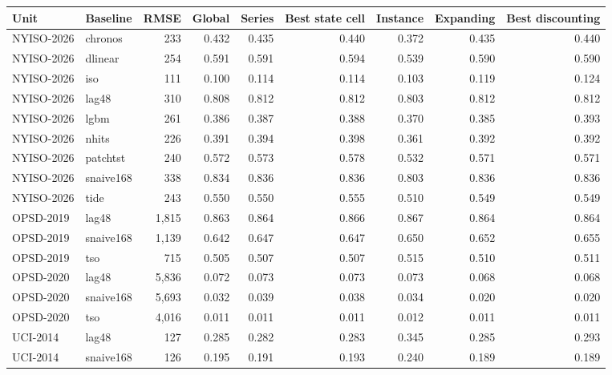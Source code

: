 \begin{tabular}{@{}l l r r r r r r r@{}}\toprule
Unit & Baseline & RMSE & Global & Series & Best state cell & Instance & Expanding & Best discounting \\\midrule
NYISO-2026 & chronos & 233 & 0.432 & 0.435 & 0.440 & 0.372 & 0.435 & 0.440 \\
NYISO-2026 & dlinear & 254 & 0.591 & 0.591 & 0.594 & 0.539 & 0.590 & 0.590 \\
NYISO-2026 & iso & 111 & 0.100 & 0.114 & 0.114 & 0.103 & 0.119 & 0.124 \\
NYISO-2026 & lag48 & 310 & 0.808 & 0.812 & 0.812 & 0.803 & 0.812 & 0.812 \\
NYISO-2026 & lgbm & 261 & 0.386 & 0.387 & 0.388 & 0.370 & 0.385 & 0.393 \\
NYISO-2026 & nhits & 226 & 0.391 & 0.394 & 0.398 & 0.361 & 0.392 & 0.392 \\
NYISO-2026 & patchtst & 240 & 0.572 & 0.573 & 0.578 & 0.532 & 0.571 & 0.571 \\
NYISO-2026 & snaive168 & 338 & 0.834 & 0.836 & 0.836 & 0.803 & 0.836 & 0.836 \\
NYISO-2026 & tide & 243 & 0.550 & 0.550 & 0.555 & 0.510 & 0.549 & 0.549 \\
OPSD-2019 & lag48 & 1,815 & 0.863 & 0.864 & 0.866 & 0.867 & 0.864 & 0.864 \\
OPSD-2019 & snaive168 & 1,139 & 0.642 & 0.647 & 0.647 & 0.650 & 0.652 & 0.655 \\
OPSD-2019 & tso & 715 & 0.505 & 0.507 & 0.507 & 0.515 & 0.510 & 0.511 \\
OPSD-2020 & lag48 & 5,836 & 0.072 & 0.073 & 0.073 & 0.073 & 0.068 & 0.068 \\
OPSD-2020 & snaive168 & 5,693 & 0.032 & 0.039 & 0.038 & 0.034 & 0.020 & 0.020 \\
OPSD-2020 & tso & 4,016 & 0.011 & 0.011 & 0.011 & 0.012 & 0.011 & 0.011 \\
UCI-2014 & lag48 & 127 & 0.285 & 0.282 & 0.283 & 0.345 & 0.285 & 0.293 \\
UCI-2014 & snaive168 & 126 & 0.195 & 0.191 & 0.193 & 0.240 & 0.189 & 0.189 \\
\bottomrule\end{tabular}

